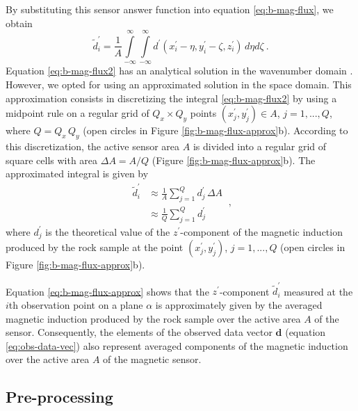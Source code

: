 \documentclass[draft,gc]{agutex}
\begin{document}
\begin{article}
\begin{equation}
\label{eq:w-function}
\end{equation}
By substituting this sensor answer function into 
equation \ref{eq:b-mag-flux}, we obtain
\begin{equation}
\tilde{d}^{\prime}_{i} = \frac{1}{A} 
\int \limits_{-\infty}^{\infty} \int \limits_{-\infty}^{\infty}
d^{\prime}(x^{\prime}_{i} - \eta, y^{\prime}_{i} - \zeta, z^{\prime}_{i}) \, d\eta d\zeta \: .
\label{eq:b-mag-flux2}
\end{equation}
Equation \ref{eq:b-mag-flux2} has an analytical solution
in the wavenumber domain \citep{egli2000}.
However, we opted for using an approximated solution in the
space domain. This approximation consists in discretizing the 
integral \ref{eq:b-mag-flux2} by using a midpoint rule on 
a regular grid of $Q_{x} \times Q_{y}$ points 
$(x^{\prime}_{j}, y^{\prime}_{j}) \in A$,
$j = 1, ..., Q$, where $Q = Q_{x} \, Q_{y}$
(open circles in Figure \ref{fig:b-mag-flux-approx}b).
According to this discretization, the active sensor area $A$ is
divided into a regular grid of square cells with area
$\Delta A = A/Q$ (Figure \ref{fig:b-mag-flux-approx}b).
The approximated integral is given by
\begin{equation}
\begin{split}
\tilde{d}^{\prime}_{i} 
&\approx \frac{1}{A} \sum \limits_{j = 1}^{Q} d^{\prime}_{j} \, \Delta A \\
&\approx \frac{1}{Q} \sum \limits_{j = 1}^{Q} d^{\prime}_{j}
\end{split} \: ,
\label{eq:b-mag-flux-approx}
\end{equation}
where $d^{\prime}_{j}$ is the theoretical value of the 
$z^{\prime}$-component of the magnetic induction produced by the rock
sample at the point $(x^{\prime}_{j}, y^{\prime}_{j})$, $j = 1, ..., Q$
(open circles in Figure \ref{fig:b-mag-flux-approx}b).

Equation \ref{eq:b-mag-flux-approx} shows that the
$z^{\prime}$-component $\tilde{d}^{\prime}_{i}$ measured at
the $i$th observation point on a plane $\alpha$ is
approximately given by the averaged magnetic induction
produced by the rock sample over the active area $A$ of the sensor.
Consequently, the elements of the observed data vector 
$\mathbf{d}$ (equation \ref{eq:obs-data-vec}) also represent
averaged components of the magnetic induction over the
active area $A$ of the magnetic sensor.

\subsection{Pre-processing}
\label{subsec:Pre-processing}


\end{article}
\end{document}
